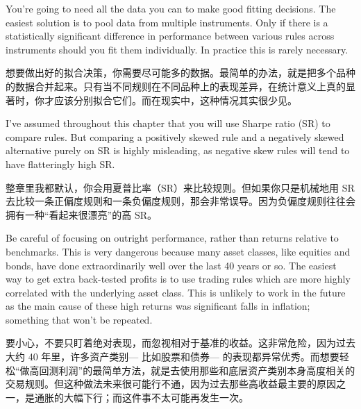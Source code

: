 \begin{englishblock} You're going to need all the data you can to make good fitting decisions. The easiest solution is to pool data from multiple instruments. Only if there is a statistically significant difference in performance between various rules across instruments should you fit them individually. In practice this is rarely necessary. \end{englishblock}

\begin{chineseblock}想要做出好的拟合决策，你需要尽可能多的数据。最简单的办法，就是把多个品种的数据合并起来。只有当不同规则在不同品种上的表现差异，在统计意义上真的显著时，你才应该分别拟合它们。而在现实中，这种情况其实很少见。\end{chineseblock}


\begin{englishblock} I've assumed throughout this chapter that you will use Sharpe ratio (SR) to compare rules. But comparing a positively skewed rule and a negatively skewed alternative purely on SR is highly misleading, as negative skew rules will tend to have flatteringly high SR. \end{englishblock}

\begin{chineseblock}整章里我都默认，你会用夏普比率（SR）来比较规则。但如果你只是机械地用 SR 去比较一条正偏度规则和一条负偏度规则，那会非常误导。因为负偏度规则往往会拥有一种“看起来很漂亮”的高 SR。 \end{chineseblock}


\begin{englishblock} Be careful of focusing on outright performance, rather than returns relative to benchmarks. This is very dangerous because many asset classes, like equities and bonds, have done extraordinarily well over the last 40 years or so. The easiest way to get extra back-tested profits is to use trading rules which are more highly correlated with the underlying asset class. This is unlikely to work in the future as the main cause of these high returns was significant falls in inflation; something that won't be repeated. \end{englishblock}

\begin{chineseblock}要小心，不要只盯着绝对表现，而忽视相对于基准的收益。这非常危险，因为过去大约 40 年里，许多资产类别--- 比如股票和债券--- 的表现都异常优秀。而想要轻松“做高回测利润”的最简单方法，就是去使用那些和底层资产类别本身高度相关的交易规则。但这种做法未来很可能行不通，因为过去那些高收益最主要的原因之一，是通胀的大幅下行；而这件事不太可能再发生一次。\end{chineseblock}


